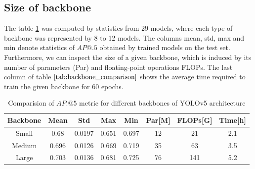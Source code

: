 \subsection{Size of backbone}
The table \ref{tab:backbone_comparison} was computed by statistics from 29 models, where each type of backbone was represented by 8 to 12 models. The columns mean, std, max and min denote statistics of $AP@.5$ obtained by trained models on the test set. Furthermore, we can inspect the size of a given backbone, which is induced by its number of parameters (Par) and floating-point operations FLOPs. The last column of table $\ref{tab:backbone_comparison}$ shows the average time required to train the given backbone for $60$ epochs.
\begin{table}[H]
    \begin{tabular}{|c|c|c|c|c|c|c|c|}
        \hline
        Backbone & Mean  & Std    & Max   & Min   & Par[M] & FLOPs[G] & Time[h] \\ \hline
        Small    & 0.68  & 0.0197 & 0.651 & 0.697 & 12     & 21       & 2.1     \\ \hline
        Medium   & 0.696 & 0.0126 & 0.669 & 0.719 & 35     & 63       & 3.5     \\ \hline
        Large    & 0.703 & 0.0136 & 0.681 & 0.725 & 76     & 141      & 5.2     \\ \hline
    \end{tabular}
    \caption{Comparision of $AP.@5$ metric for different backbones of YOLOv5 architecture}
    \label{tab:backbone_comparison}
\end{table}

